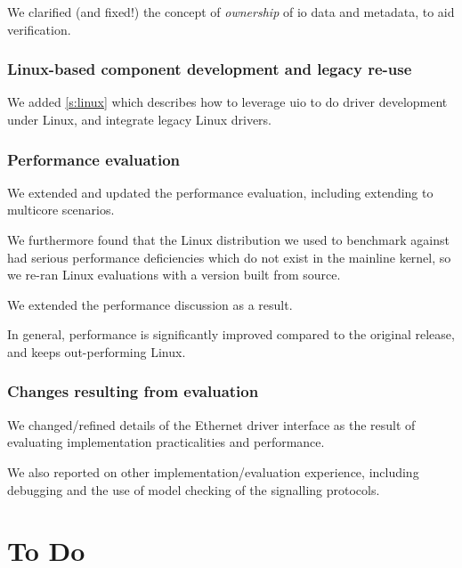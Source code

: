 \documentclass[a4paper,12pt]{report}
\begin{document}
We clarified (and fixed!) the concept of \emph{ownership} of \gls{io} data
and metadata, to aid verification.

\subsection{Linux-based component development and legacy re-use}

We added \autoref{s:linux} which describes how to leverage \gls{uio} to do
driver development under Linux, and integrate legacy Linux drivers.

\subsection{Performance evaluation}

We extended and updated the performance evaluation, including
extending to multicore scenarios.

We furthermore found that the Linux distribution we used to benchmark
against had serious performance deficiencies which do not exist in the
mainline kernel, so we re-ran Linux evaluations with a version built
from source.

We extended the performance discussion as a result.

In general, performance is significantly improved compared to the
original release, and keeps out-performing Linux.

\subsection{Changes resulting from evaluation}

We changed/refined details of the Ethernet driver interface as the
result of evaluating implementation practicalities and performance.

We also reported on other implementation/evaluation experience,
including debugging and the use of model checking of the signalling protocols.

\ifDraft

\chapter{To Do}\label{s:to-do}
\end{document}
